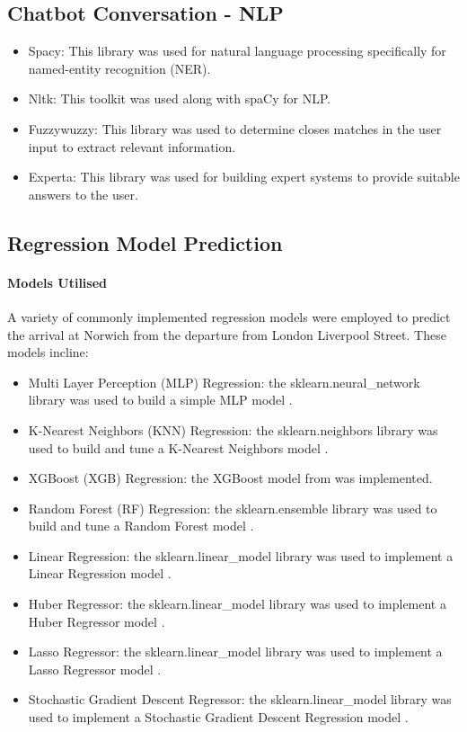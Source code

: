 \subsection{Chatbot Conversation - NLP}\label{Sec: Methods/NLP}
    \begin{itemize}
        \item Spacy: This library was used for natural language processing specifically for named-entity recognition (NER).
        \item Nltk: This toolkit was used along with spaCy for NLP.
        \item Fuzzywuzzy: This library was used to determine closes matches in the user input to extract relevant information.
        \item Experta: This library was used for building expert systems to provide suitable answers to the user.
    \end{itemize}
\subsection{Regression Model Prediction}
\paragraph{Models Utilised}
A variety of commonly implemented regression models were employed to predict the arrival at Norwich from the departure from London Liverpool Street. These models incline:
\begin{itemize}
    \item Multi Layer Perception (MLP) Regression: the sklearn.neural\_network library was used to build a simple MLP model \citep{scikit-learn}.
    \item K-Nearest Neighbors (KNN) Regression: the sklearn.neighbors library was used to build and tune a K-Nearest Neighbors model \citep{scikit-learn}.
    \item XGBoost (XGB) Regression: the XGBoost model from \cite{chen2016xgboost} was implemented.
    \item Random Forest (RF) Regression: the sklearn.ensemble library was used to build and tune a Random Forest model \citep{scikit-learn}.
    \item Linear Regression: the sklearn.linear\_model library was used to implement a Linear Regression model \citep{scikit-learn}.
    \item Huber Regressor: the sklearn.linear\_model library was used to implement a Huber Regressor model \citep{scikit-learn}.
    \item Lasso Regressor: the sklearn.linear\_model library was used to implement a Lasso Regressor model \citep{scikit-learn}.
    \item Stochastic Gradient Descent Regressor: the sklearn.linear\_model library was used to implement a Stochastic Gradient Descent Regression model \citep{scikit-learn}.
\end{itemize}

